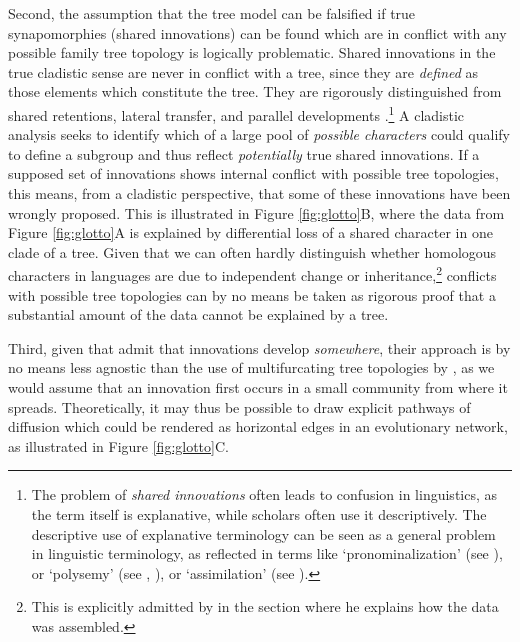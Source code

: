 \documentclass[svgnames,12pt]{scrartcl}
\begin{document}
{{Second, the assumption that the tree
model can be falsified if true synapomorphies (shared innovations) can be found which are in
conflict with any possible family tree topology is logically problematic.
Shared innovations in the true cladistic sense are
never in conflict with a tree, since they are \emph{defined} as those elements which constitute the
tree. They are rigorously distinguished from shared retentions, lateral transfer, and
parallel developments \citep{Fleischhauer2009}.\footnote{The problem of \emph{shared innovations}
often leads to confusion in linguistics, as the term itself is explanative, while scholars often use
it descriptively. The descriptive use of explanative terminology can be seen as a general problem in
linguistic terminology, as reflected in terms like `{pronominalization}' (see
\citealt[2]{Jacques2016c}), or `{polysemy}' (see \citealt{Francois2008},
\citealt{List2013a}), or `{assimilation}' (see \citealt[32]{List2014d}).}
A cladistic analysis seeks to identify which
of a large pool of \emph{possible characters} could qualify to define a subgroup and thus reflect
\emph{potentially} true shared innovations. If a supposed set of innovations shows internal conflict
with possible tree topologies, this means, from a cladistic perspective, that some of these
innovations have been wrongly proposed. This is illustrated in Figure \ref{fig:glotto}B, where the data from Figure
\ref{fig:glotto}A is explained by differential loss of a shared character in one clade of a tree. Given
that we can often hardly distinguish whether homologous characters in languages are due to independent
change or inheritance,\footnote{This is explicitly admitted by \citet{Francois2015} in the section
where he explains how the data was assembled.} conflicts with possible tree topologies
can by no means be taken as rigorous proof that a substantial
amount of the data cannot
be explained by a tree. 
 
Third, given that \citet{Kalyan2016} admit that innovations develop
\emph{somewhere}, their approach is by no means less agnostic than the use of multifurcating tree
topologies by \citet{Ross1988}, as we would assume that an innovation first occurs in a small
community from where it spreads. Theoretically, it may thus be possible to draw explicit pathways of
diffusion which could be rendered as horizontal edges in an evolutionary network, as illustrated in
Figure \ref{fig:glotto}C.
 

}}
\end{document}
